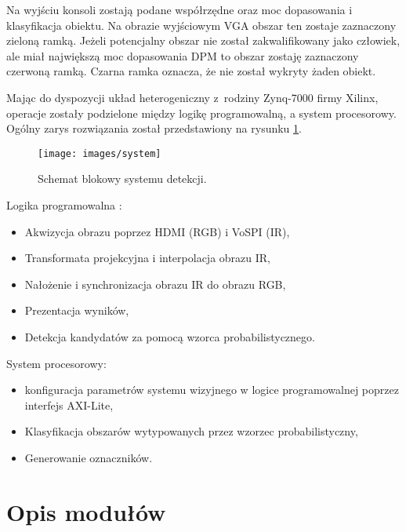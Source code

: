 Na wyjściu konsoli zostają podane współrzędne oraz moc dopasowania i klasyfikacja obiektu. %
Na obrazie wyjściowym VGA obszar ten zostaje zaznaczony zieloną ramką. 
Jeżeli potencjalny obszar nie został zakwalifikowany jako człowiek, ale miał największą moc dopasowania DPM to obszar zostaję zaznaczony czerwoną ramką. Czarna ramka oznacza, że nie został wykryty żaden obiekt. %

Mając do dyspozycji układ heterogeniczny z~rodziny Zynq-7000 firmy Xilinx, operacje zostały podzielone między logikę programowalną, a system procesorowy. Ogólny zarys rozwiązania został przedstawiony na rysunku \ref{fig:systemwizyjny}.

\begin{figure}[h]
    \centering
    \texttt{[image: images/system]}
    \caption{Schemat blokowy systemu detekcji.}
    \label{fig:systemwizyjny}
\end{figure}

Logika programowalna :
\begin{itemize}
\item Akwizycja obrazu poprzez HDMI (RGB) i VoSPI (IR),
\item Transformata projekcyjna i interpolacja obrazu IR,
\item Nałożenie i synchronizacja obrazu IR do obrazu RGB,
\item Prezentacja wyników,
\item Detekcja kandydatów za pomocą wzorca probabilistycznego.
\end{itemize}
System procesorowy:
\begin{itemize}
\item konfiguracja parametrów systemu wizyjnego w logice programowalnej poprzez interfejs AXI-Lite,
\item Klasyfikacja obszarów wytypowanych przez wzorzec probabilistyczny,
\item Generowanie oznaczników. %
\end{itemize}

\section{Opis modułów}



